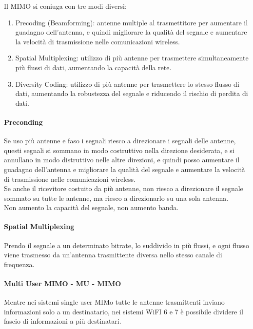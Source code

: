 Il MIMO si coniuga con tre modi diversi:
\begin{enumerate}
    \item Precoding (Beamforming): antenne multiple al trasmettitore per aumentare il guadagno dell'antenna, e quindi migliorare la qualità del segnale e aumentare la velocità di trasmissione nelle comunicazioni wireless.\\
    \item Spatial Multiplexing: utilizzo di più antenne per trasmettere simultaneamente più flussi di dati, aumentando la capacità della rete.\\
    \item Diversity Coding: utilizzo di più antenne per trasmettere lo stesso flusso di dati, aumentando la robustezza del segnale e riducendo il rischio di perdita di dati.\\
\end{enumerate}

\paragraph{Preconding}

Se uso più antenne e faso i segnali riesco a direzionare i segnali delle antenne, questi segnali si sommano in modo costruttivo nella direzione desiderata, e si annullano in modo distruttivo nelle altre direzioni, e quindi posso aumentare il guadagno dell'antenna e migliorare la qualità del segnale e aumentare la velocità di trasmissione nelle comunicazioni wireless.\\
Se anche il ricevitore costuito da più antenne, non riesco a direzionare il segnale sommato su tutte le antenne, ma riesco a direzionarlo su una sola antenna.\\ 
Non aumento la capacità del segnale, non aumento banda.\\
\paragraph{Spatial Multiplexing}
Prendo il segnale a un determinato bitrate, lo suddivido in più flussi, e ogni flusso viene trasmesso da un'antenna trasmittente diversa nello stesso canale di frequenza.

\paragraph{Multi User MIMO - MU - MIMO}

Mentre nei sistemi single user MIMo tutte le antenne trasmittenti inviano informazioni solo a un destinatario, nei sistemi WiFI 6 e 7 è possibile dividere il fascio di informazioni a più destinatari.

